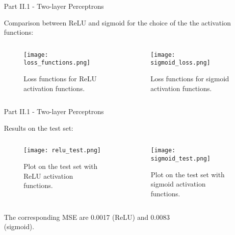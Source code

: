 \documentclass{beamer}
\begin{document}
\begin{frame}{Part II.1 - Two-layer Perceptrons}
    
    Comparison between ReLU and sigmoid for the choice of the the activation functions:
    
  \begin{columns}[T]
    \begin{column}{.5\textwidth}
    \begin{block}{}
    \begin{figure} [H]
    \centering
    \texttt{[image: loss\_functions.png]}
    \caption{Loss functions for ReLU activation functions.}
    \end{figure}
    \end{block}
    \end{column}
    \begin{column}{.5\textwidth}
    \begin{block}{}
    \begin{figure} [H]
    \centering
    \texttt{[image: sigmoid\_loss.png]}
    \caption{Loss functions for sigmoid activation functions.}
    \end{figure}
    \end{block}
    \end{column}
  \end{columns}
    
\end{frame}


\begin{frame}{Part II.1 - Two-layer Perceptrons}
    
    Results on the test set:
    
  \begin{columns}[T]
    \begin{column}{.5\textwidth}
    \begin{block}{}
    \begin{figure} [H]
    \centering
    \texttt{[image: relu\_test.png]}
    \caption{Plot on the test set with ReLU activation functions.}
    \end{figure}
    \end{block}
    \end{column}
    \begin{column}{.5\textwidth}
    \begin{block}{}
    \begin{figure} [H]
    \centering
    \texttt{[image: sigmoid\_test.png]}
    \caption{Plot on the test set with sigmoid activation functions.}
    \end{figure}
    \end{block}
    \end{column}
  \end{columns}
  
  The corresponding MSE are 0.0017 (ReLU) and 0.0083 \\ (sigmoid). 
    
\end{frame}
\end{document}
